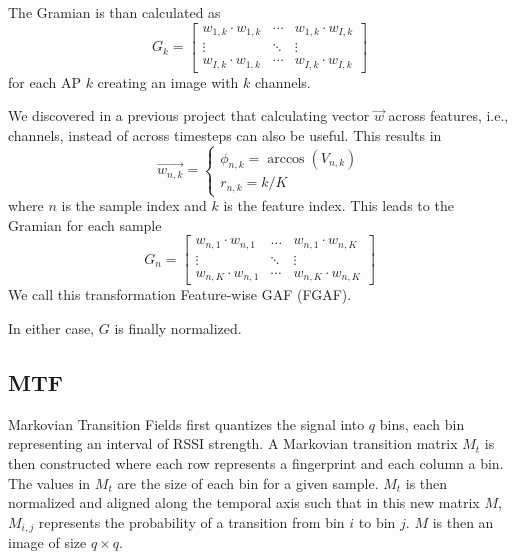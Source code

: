 The Gramian is than calculated as
\begin{equation}
	G_k = \begin{bmatrix}
		w_{1,k} \cdot w_{1,k} & \cdots & w_{1,k} \cdot w_{I,k} \\
		\vdots                & \ddots & \vdots \\
		w_{I,k} \cdot w_{1,k} & \cdots & w_{I,k} \cdot w_{I,k}
	\end{bmatrix}
\end{equation}
for each AP $k$ creating an image with $k$ channels.

We discovered in a previous project that calculating vector $\vec{w}$ across features, i.e., channels, instead of across timesteps can also be useful. 
This results in
\begin{equation}
	\vec{w_{n, k}} = \begin{cases}
		\phi_{n, k} = \arccos(V_{n, k}) \\
		r_{n, k} = k / K
	\end{cases}
\end{equation}
where $n$ is the sample index and $k$ is the feature index. This leads to the Gramian for each sample 
\begin{equation}
	G_n = \begin{bmatrix}
		w_{n, 1} \cdot w_{n, 1} & \ldots & w_{n, 1} \cdot w_{n, K} \\
		\vdots                  & \ddots & \vdots \\
		w_{n, K} \cdot w_{n, 1} & \cdots & w_{n, K} \cdot w_{n, K}
	\end{bmatrix}
\end{equation}
We call this transformation Feature-wise GAF (FGAF).

In either case, $G$ is finally normalized.

\subsection{MTF}
Markovian Transition Fields \cite{wang2015imaging} first quantizes the signal into $q$ bins, each bin representing an interval of RSSI strength.
A Markovian transition matrix $M_{t}$ is then constructed where each row represents a fingerprint and each column a bin. 
The values in $M_{t}$ are the size of each bin for a given sample.
$M_{t}$ is then normalized and aligned along the temporal axis such that in this new matrix $M$, $M_{i, j}$ represents the probability of a transition from bin $i$ to bin $j$.
$M$ is then an image of size $q \times q$.

